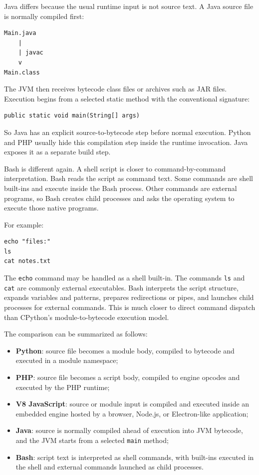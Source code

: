 \documentclass[a4paper,twoside]{report}
\begin{document}
Java differs because the usual runtime input is not source text. A Java source file is normally compiled first:

\begin{verbatim}
Main.java
    |
    | javac
    v
Main.class
\end{verbatim}

The JVM then receives bytecode class files or archives such as JAR files. Execution begins from a selected static method with the conventional signature:

\begin{verbatim}
public static void main(String[] args)
\end{verbatim}

So Java has an explicit source-to-bytecode step before normal execution. Python and PHP usually hide this compilation step inside the runtime invocation. Java exposes it as a separate build step.

Bash is different again. A shell script is closer to command-by-command interpretation. Bash reads the script as command text. Some commands are shell built-ins and execute inside the Bash process. Other commands are external programs, so Bash creates child processes and asks the operating system to execute those native programs.

For example:

\begin{verbatim}
echo "files:"
ls
cat notes.txt
\end{verbatim}

The \texttt{echo} command may be handled as a shell built-in. The commands \texttt{ls} and \texttt{cat} are commonly external executables. Bash interprets the script structure, expands variables and patterns, prepares redirections or pipes, and launches child processes for external commands. This is much closer to direct command dispatch than CPython's module-to-bytecode execution model.

The comparison can be summarized as follows:

\begin{itemize}
    \item \textbf{Python}: source file becomes a module body, compiled to bytecode and executed in a module namespace;
    \item \textbf{PHP}: source file becomes a script body, compiled to engine opcodes and executed by the PHP runtime;
    \item \textbf{V8 JavaScript}: source or module input is compiled and executed inside an embedded engine hosted by a browser, Node.js, or Electron-like application;
    \item \textbf{Java}: source is normally compiled ahead of execution into JVM bytecode, and the JVM starts from a selected \texttt{main} method;
    \item \textbf{Bash}: script text is interpreted as shell commands, with built-ins executed in the shell and external commands launched as child processes.
\end{itemize}
\end{document}
